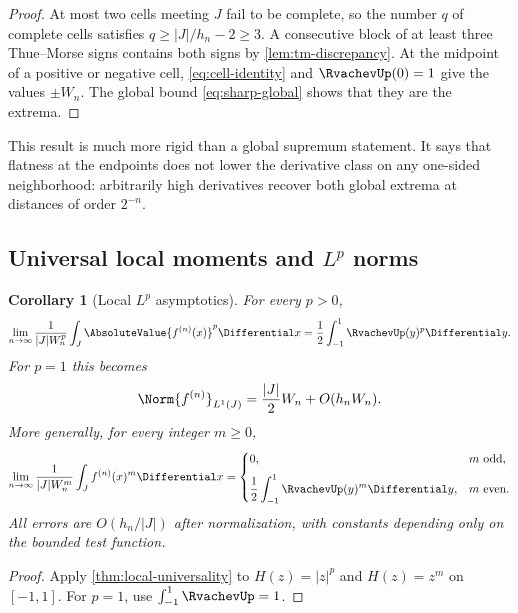 \documentclass[11pt,a4paper]{article}
\newtheorem{corollary}[theorem]{Corollary}
\theoremstyle{definition}
\theoremstyle{remark}
\begin{document}
\begin{proof}
At most two cells meeting $J$ fail to be complete, so the number $q$ of complete
cells satisfies $q\ge |J|/h_n-2\ge3$.  A consecutive block of at least three
Thue--Morse signs contains both signs by \cref{lem:tm-discrepancy}.  At the midpoint
of a positive or negative cell, \eqref{eq:cell-identity} and $\RvachevUp(0)=1$ give the
values $\pm W_n$.  The global bound \eqref{eq:sharp-global} shows that they are the
extrema.
\end{proof}

This result is much more rigid than a global supremum statement.  It says that
flatness at the endpoints does not lower the derivative class on any one-sided
neighborhood: arbitrarily high derivatives recover both global extrema at distances
of order $2^{-n}$.

\subsection{Universal local moments and \texorpdfstring{$L^p$}{Lp} norms}

\begin{corollary}[Local $L^p$ asymptotics]
\label{cor:lp}
For every $p>0$,
\begin{equation}
 \lim_{n\to\infty}
 \frac{1}{|J|W_n^p}\int_J\AbsoluteValue{f^{(n)}(x)}^p\Differential x
 =\frac12\int_{-1}^{1}\RvachevUp(y)^p\Differential y.
 \label{eq:lp-limit}
\end{equation}
For $p=1$ this becomes
\begin{equation}
  \Norm{f^{(n)}}_{L^1(J)}
  =\frac{|J|}{2}W_n+O(h_nW_n).
  \label{eq:l1-local}
\end{equation}
More generally, for every integer $m\ge0$,
\begin{equation}
 \lim_{n\to\infty}
 \frac{1}{|J|W_n^m}\int_J f^{(n)}(x)^m\Differential x
 =\begin{cases}
  0,&m\text{ odd},\\[2mm]
  \displaystyle\frac12\int_{-1}^{1}\RvachevUp(y)^m\Differential y,&m\text{ even}.
 \end{cases}
 \label{eq:signed-moment-limit}
\end{equation}
All errors are $O(h_n/|J|)$ after normalization, with constants depending only on
the bounded test function.
\end{corollary}

\begin{proof}
Apply \cref{thm:local-universality} to $H(z)=|z|^p$ and $H(z)=z^m$ on
$[-1,1]$.  For $p=1$, use $\int_{-1}^{1}\RvachevUp=1$.
\end{proof}
\end{document}

